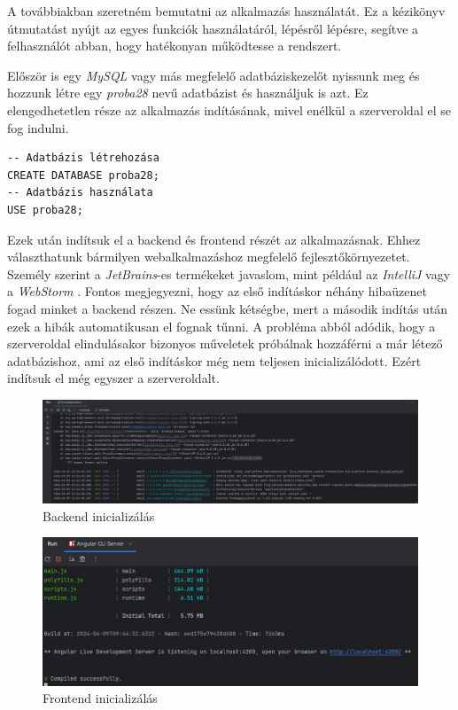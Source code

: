 
A továbbiakban szeretném bemutatni az alkalmazás használatát. Ez a kézikönyv útmutatást nyújt az egyes funkciók használatáról, lépésről lépésre, segítve a felhasználót abban, hogy hatékonyan működtesse a rendszert.


Először is egy \textit{MySQL} vagy más megfelelő adatbáziskezelőt nyissunk meg és hozzunk létre egy \textit{proba28} nevű adatbázist és használjuk is azt. Ez elengedhetetlen része az alkalmazás indításának, mivel enélkül a szerveroldal el se fog indulni.


\begin{lstlisting}
-- Adatbázis létrehozása
CREATE DATABASE proba28;
-- Adatbázis használata
USE proba28;
\end{lstlisting}

Ezek után indítsuk el a backend és frontend részét az alkalmazásnak. Ehhez választhatunk bármilyen webalkalmazáshoz megfelelő fejlesztőkörnyezetet. Személy szerint a \textit{JetBrains}-es \cite{JetBrains} termékeket javaslom, mint például az \textit{IntelliJ} \cite{IntelliJ} vagy a \textit{WebStorm} \cite{WebStorm}. Fontos megjegyezni, hogy az első indításkor néhány hibaüzenet fogad minket a backend részen. Ne essünk kétségbe, mert a második indítás után ezek a hibák automatikusan el fognak tűnni. A probléma abból adódik, hogy a szerveroldal elindulásakor bizonyos műveletek próbálnak hozzáférni a már létező adatbázishoz, ami az első indításkor még nem teljesen inicializálódott. Ezért indítsuk el még egyszer a szerveroldalt.

\begin{figure}[h]
\centering
\includegraphics[width=\textwidth]{images/backend_running.png}
\caption{Backend inicializálás}
\label{fig:backend}
\end{figure}

\begin{figure}[h]
\centering
\includegraphics[width=\textwidth]{images/frontend_running.png}
\caption{Frontend inicializálás}
\label{fig:frontend}
\end{figure}
\newpage

